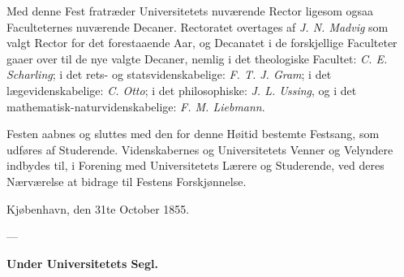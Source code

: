 \documentclass[12pt,a4paper]{article}
\newcommand{\opage}[1]{\marginnote{\footnotesize\textit{[#1]}}}
\begin{document}
Med denne Fest fratræder Universitetets nuværende Rector ligesom ogsaa
Faculteternes nuværende Decaner. Rectoratet overtages af \emph{J. N. Madvig} som
valgt Rector for det forestaaende Aar, og Decanatet i de forskjellige Faculteter
gaaer over til de nye valgte Decaner, nemlig i det theologiske Facultet:
\emph{C. E. Scharling}; i det rets- og statsvidenskabelige: \emph{F. T. J. Gram};
i det lægevidenskabelige: \emph{C. Otto}; i det philosophiske: \emph{J. L.
Ussing}, og i det mathematisk-naturvidenskabelige: \emph{F. M. Liebmann}.

Festen aabnes og sluttes med den for denne Høitid bestemte Festsang, som udføres
af Studerende.
\opage{47} Videnskabernes og Universitetets Venner og Velyndere indbydes til, i Forening med
Universitetets Lærere og Studerende, ved deres Nærværelse at bidrage til Festens
Forskjønnelse.

\bigskip
\noindent Kjøbenhavn, den 31te October 1855.

\begin{center}---\end{center}

\begin{center}\textbf{Under Universitetets Segl.}\end{center}

\end{document}
